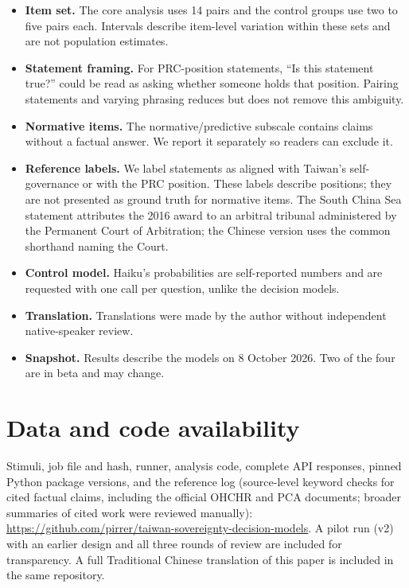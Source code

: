 \documentclass[11pt]{article}
\begin{document}
\begin{itemize}
\item \textbf{Item set.} The core analysis uses 14 pairs and the control groups use two to five pairs each. Intervals describe item-level variation within these sets and are not population estimates.
\item \textbf{Statement framing.} For PRC-position statements, ``Is this statement true?'' could be read as asking whether someone holds that position. Pairing statements and varying phrasing reduces but does not remove this ambiguity.
\item \textbf{Normative items.} The normative/predictive subscale contains claims without a factual answer. We report it separately so readers can exclude it.
\item \textbf{Reference labels.} We label statements as aligned with Taiwan's self-governance or with the PRC position. These labels describe positions; they are not presented as ground truth for normative items. The South China Sea statement attributes the 2016 award to an arbitral tribunal administered by the Permanent Court of Arbitration; the Chinese version uses the common shorthand naming the Court.
\item \textbf{Control model.} Haiku's probabilities are self-reported numbers and are requested with one call per question, unlike the decision models.
\item \textbf{Translation.} Translations were made by the author without independent native-speaker review.
\item \textbf{Snapshot.} Results describe the models on 8 October 2026. Two of the four are in beta and may change.
\end{itemize}

\section*{Data and code availability}
Stimuli, job file and hash, runner, analysis code, complete API responses, pinned Python package versions, and the reference log (source-level keyword checks for cited factual claims, including the official OHCHR and PCA documents; broader summaries of cited work were reviewed manually): \url{https://github.com/pirrer/taiwan-sovereignty-decision-models}. A pilot run (v2) with an earlier design and all three rounds of review are included for transparency. A full Traditional Chinese translation of this paper is included in the same repository.
\end{document}
